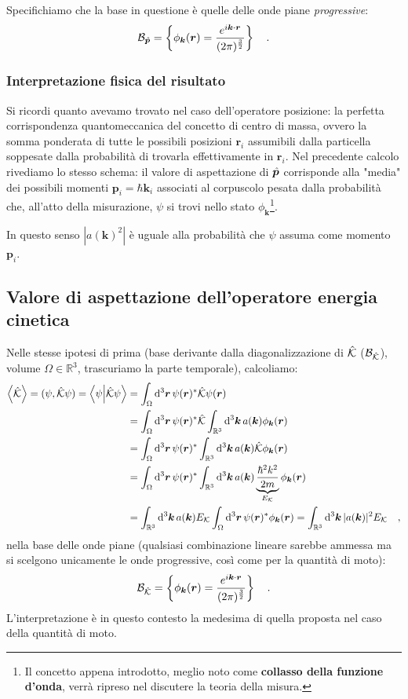 Specifichiamo che la base in questione è quelle delle onde piane \emph{progressive}:
\[
   \mathcal{B}_{\hat{\bm{p}}} = \left\{ \phi_{\bm{k}}(\bm{r}) = \frac{e^{i\bm{k}\cdot\bm{r}}}{(2\pi)^{\frac{3}{2}}} \right\} \quad.
\]

\subsubsection{Interpretazione fisica del risultato}
Si ricordi quanto avevamo trovato nel caso dell'operatore posizione: la perfetta corrispondenza quantomeccanica del concetto di centro di massa, ovvero la somma ponderata di tutte le possibili posizioni $\bm{r}_i$ assumibili dalla particella soppesate dalla probabilità di trovarla effettivamente in $\bm{r}_i$. Nel precedente calcolo rivediamo lo stesso schema: il valore di aspettazione di $\hat{\bm{p}}$ corrisponde alla "media" dei possibili momenti $\bm{p}_i = \hbar \bm{k}_i$ associati al corpuscolo pesata dalla probabilità che, all'atto della misurazione, $\psi$ si trovi nello stato $\phi_{\bm{k}}$\footnote{Il concetto appena introdotto, meglio noto come \textbf{collasso della funzione d'onda}, verrà ripreso nel discutere la teoria della misura.}. 

In questo senso $|a(\bm{k})^2|$ è uguale alla probabilità che $\psi$ assuma come momento $\bm{p}_i$.

\subsection{Valore di aspettazione dell'operatore energia cinetica}
Nelle stesse ipotesi di prima (base derivante dalla diagonalizzazione di $\hat{\mathcal{K}}$ ($\mathcal{B}_{\hat{\mathcal{K}}}$), volume $\Omega \in \mathbb{R}^3$, trascuriamo la parte temporale), calcoliamo:
\[
    \begin{aligned}
        \left\langle \hat{\mathcal{K}} \right\rangle = (\psi, \hat{\mathcal{K}} \psi) = \braket{\psi}{\hat{\mathcal{K}}\psi} &= \int_\Omega \dd^3{\bm{r}} \, \psi(\bm{r})^*\hat{\mathcal{K}}\psi(\bm{r}) \\
        &= \int_\Omega \dd^3{\bm{r}} \, \psi(\bm{r})^* \hat{\mathcal{K}} \int_{\mathbb{R}^3} \dd^3{\bm{k}} \, a(\bm{k}) \phi_{\bm{k}}(\bm{r}) \\
        &= \int_\Omega \dd^3{\bm{r}} \, \psi(\bm{r})^* \int_{\mathbb{R}^3} \dd^3{\bm{k}} \, a(\bm{k}) \hat{\mathcal{K}} \phi_{\bm{k}}(\bm{r}) \\
        &= \int_\Omega \dd^3{\bm{r}} \, \psi(\bm{r})^* \int_{\mathbb{R}^3} \dd^3{\bm{k}} \, a(\bm{k}) \underbrace{\frac{\hbar^2 k^2}{2m}}_{E_{\mathcal{K}}} \phi_{\bm{k}}(\bm{r}) \\
        &= \int_{\mathbb{R}^3} \dd^3{\bm{k}} \, a(\bm{k}) E_{\mathcal{K}} \int_\Omega \dd^3{\bm{r}} \, \psi(\bm{r})^* \phi_{\bm{k}}(\bm{r}) = \int_{\mathbb{R}^3} \dd^3{\bm{k}} \, |a(\bm{k})|^2 E_{\mathcal{K}} \quad,
    \end{aligned}
\]
nella base delle onde piane (qualsiasi combinazione lineare sarebbe ammessa ma si scelgono unicamente le onde progressive, così come per la quantità di moto):
\[
   \mathcal{B}_{\hat{\mathcal{K}}} = \left\{ \phi_{\bm{k}}(\bm{r}) = \frac{e^{i\bm{k}\cdot\bm{r}}}{(2\pi)^{\frac{3}{2}}} \right\} \quad.
\]
L'interpretazione è in questo contesto la medesima di quella proposta nel caso della quantità di moto.

